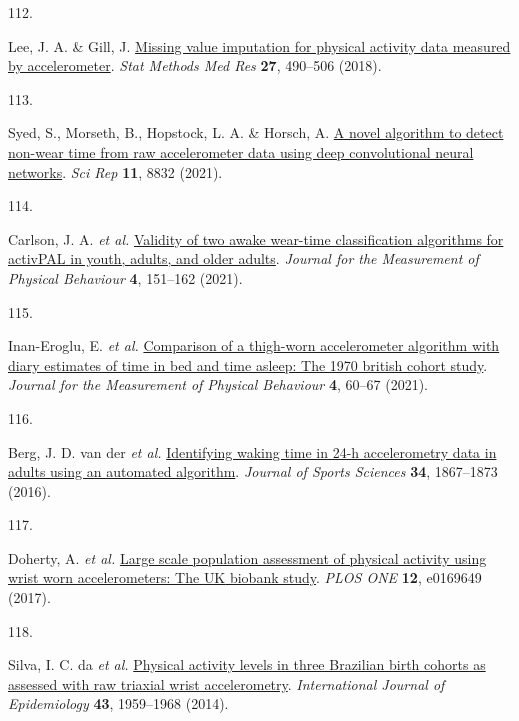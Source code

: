 \documentclass[
  10pt,
]{scrbook}
\newlength{\cslhangindent}
\newlength{\csllabelwidth}
\newlength{\cslentryspacingunit} %
\newenvironment{CSLReferences}[2] %
 {%
  \setlength{\parindent}{0pt}
  \ifodd #1
  \let\oldpar\par
  \def\par{\hangindent=\cslhangindent\oldpar}
  \fi
  \setlength{\parskip}{#2\cslentryspacingunit}
 }%
 {}
\newcommand{\CSLLeftMargin}[1]{\parbox[t]{\csllabelwidth}{#1}}
\newcommand{\CSLRightInline}[1]{\parbox[t]{\linewidth - \csllabelwidth}{#1}\break}
\let\originaltextbf\textbf
\renewcommand{\textbf}[1]{\textcolor{color1}{\textsf{\originaltextbf{#1}}}}
\begin{document}
\begin{CSLReferences}{0}{0}
\leavevmode{}%
\CSLLeftMargin{112. }%
\CSLRightInline{Lee, J. A. \& Gill, J.
\href{https://doi.org/10.1177/0962280216633248}{Missing value imputation
for physical activity data measured by accelerometer}. \emph{Stat
Methods Med Res} \textbf{27}, 490--506 (2018).}

\leavevmode{}%
\CSLLeftMargin{113. }%
\CSLRightInline{Syed, S., Morseth, B., Hopstock, L. A. \& Horsch, A.
\href{https://doi.org/10.1038/s41598-021-87757-z}{A novel algorithm to
detect non-wear time from raw accelerometer data using deep
convolutional neural networks}. \emph{Sci Rep} \textbf{11}, 8832
(2021).}

\leavevmode{}%
\CSLLeftMargin{114. }%
\CSLRightInline{Carlson, J. A. \emph{et al.}
\href{https://doi.org/10.1123/jmpb.2020-0045}{Validity of two awake
wear-time classification algorithms for {activPAL} in youth, adults, and
older adults}. \emph{Journal for the Measurement of Physical Behaviour}
\textbf{4}, 151--162 (2021).}

\leavevmode{}%
\CSLLeftMargin{115. }%
\CSLRightInline{Inan-Eroglu, E. \emph{et al.}
\href{https://doi.org/10.1123/jmpb.2020-0033}{Comparison of a thigh-worn
accelerometer algorithm with diary estimates of time in bed and time
asleep: The 1970 british cohort study}. \emph{Journal for the
Measurement of Physical Behaviour} \textbf{4}, 60--67 (2021).}

\leavevmode{}%
\CSLLeftMargin{116. }%
\CSLRightInline{Berg, J. D. van der \emph{et al.}
\href{https://doi.org/10.1080/02640414.2016.1140908}{Identifying waking
time in 24-h accelerometry data in adults using an automated algorithm}.
\emph{Journal of Sports Sciences} \textbf{34}, 1867--1873 (2016).}

\leavevmode{}%
\CSLLeftMargin{117. }%
\CSLRightInline{Doherty, A. \emph{et al.}
\href{https://doi.org/10.1371/journal.pone.0169649}{Large scale
population assessment of physical activity using wrist worn
accelerometers: The {UK} biobank study}. \emph{{PLOS} {ONE}}
\textbf{12}, e0169649 (2017).}

\leavevmode{}%
\CSLLeftMargin{118. }%
\CSLRightInline{Silva, I. C. da \emph{et al.}
\href{https://doi.org/10.1093/ije/dyu203}{Physical activity levels in
three Brazilian birth cohorts as assessed with raw triaxial wrist
accelerometry}. \emph{International Journal of Epidemiology}
\textbf{43}, 1959--1968 (2014).}


\end{CSLReferences}
\end{document}
